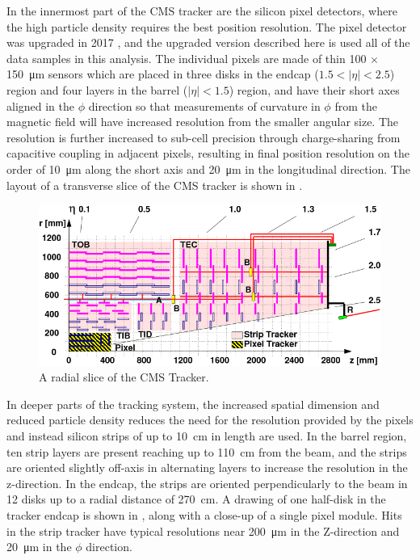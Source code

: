 In the innermost part of the CMS tracker are the silicon pixel detectors, where the high particle density requires the best position resolution. 
The pixel detector was upgraded in 2017 \cite{pixelUpgrade}, and the upgraded version described here is used all of the data samples in this analysis. 
The individual pixels are made of thin 100 $\times$ \SI{150}{\micro\meter} sensors which are placed in three disks in the endcap ($1.5<\lvert\eta\rvert<2.5$) region and four layers in the barrel ($\lvert\eta\rvert<1.5$) region, and have their short axes aligned in the $\phi$ direction so that measurements of curvature in $\phi$ from the magnetic field will have increased resolution from the smaller angular size. 
The resolution is further increased to sub-cell precision through charge-sharing from capacitive coupling in adjacent pixels, resulting in final position resolution on the order of \SI{10}{\micro\meter} along the short axis and \SI{20}{\micro\meter} in the longitudinal direction.
The layout of a transverse slice of the CMS tracker is shown in .

\begin{figure}[htbp]
    \includegraphics[width=1.\textwidth]{figures/cms_tracker.png}
    \centering
    \caption{A radial slice of the CMS Tracker.}
    \label{fig:cmsTracker}
\end{figure}

In deeper parts of the tracking system, the increased spatial dimension and reduced particle density reduces the need for the resolution provided by the pixels and instead silicon strips of up to \SI{10}{\centi\meter} in length are used. 
In the barrel region, ten strip layers are present reaching up to \SI{110}{\centi\meter} from the beam, and the strips are oriented slightly off-axis in alternating layers to increase the resolution in the z-direction. 
In the endcap, the strips are oriented perpendicularly to the beam in 12 disks up to a radial distance of \SI{270}{\centi\meter}.
A drawing of one half-disk in the tracker endcap is shown in , along with a close-up of a single pixel module.
Hits in the strip tracker have typical resolutions near \SI{200}{\micro\meter} in the Z-direction and \SI{20}{\micro\meter} in the $\phi$ direction.

